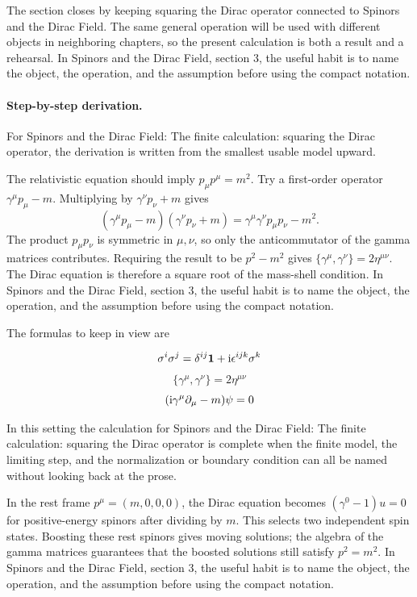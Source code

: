 The section closes by keeping squaring the Dirac operator connected to Spinors and the Dirac Field.  The same general operation will be used with different objects in neighboring chapters, so the present calculation is both a result and a rehearsal.  In Spinors and the Dirac Field, section 3, the useful habit is to name the object, the operation, and the assumption before using the compact notation.



\paragraph{Step-by-step derivation.}

For Spinors and the Dirac Field: The finite calculation: squaring the Dirac operator, the derivation is written from the smallest usable model upward.

The relativistic equation should imply \(p_\mu p^\mu=m^2\).  Try a first-order operator \(\gamma^\mu p_\mu-m\).  Multiplying by \(\gamma^\nu p_\nu+m\) gives
\[
  (\gamma^\mu p_\mu-m)(\gamma^\nu p_\nu+m)
  =
  \gamma^\mu\gamma^\nu p_\mu p_\nu-m^2.
\]
The product \(p_\mu p_\nu\) is symmetric in \(\mu,\nu\), so only the anticommutator of the gamma matrices contributes.  Requiring the result to be \(p^2-m^2\) gives \(\{\gamma^\mu,\gamma^\nu\}=2\eta^{\mu\nu}\).  The Dirac equation is therefore a square root of the mass-shell condition.  In Spinors and the Dirac Field, section 3, the useful habit is to name the object, the operation, and the assumption before using the compact notation.

The formulas to keep in view are

\[
  \sigma^i\sigma^j=\delta^{ij}\mathbf 1+\mathrm i\epsilon^{ijk}\sigma^k
\]
\[
  \{\gamma^\mu,\gamma^\nu\}=2\eta^{\mu\nu}
\]
\[
  (\mathrm i\gamma^\mu\partial_\mu-m)\psi=0
\]

In this setting the calculation for Spinors and the Dirac Field: The finite calculation: squaring the Dirac operator is complete when the finite model, the limiting step, and the normalization or boundary condition can all be named without looking back at the prose.




\begin{example}
In the rest frame \(p^\mu=(m,0,0,0)\), the Dirac equation becomes \((\gamma^0-1)u=0\) for positive-energy spinors after dividing by \(m\).  This selects two independent spin states.  Boosting these rest spinors gives moving solutions; the algebra of the gamma matrices guarantees that the boosted solutions still satisfy \(p^2=m^2\).  In Spinors and the Dirac Field, section 3, the useful habit is to name the object, the operation, and the assumption before using the compact notation.
\end{example}



